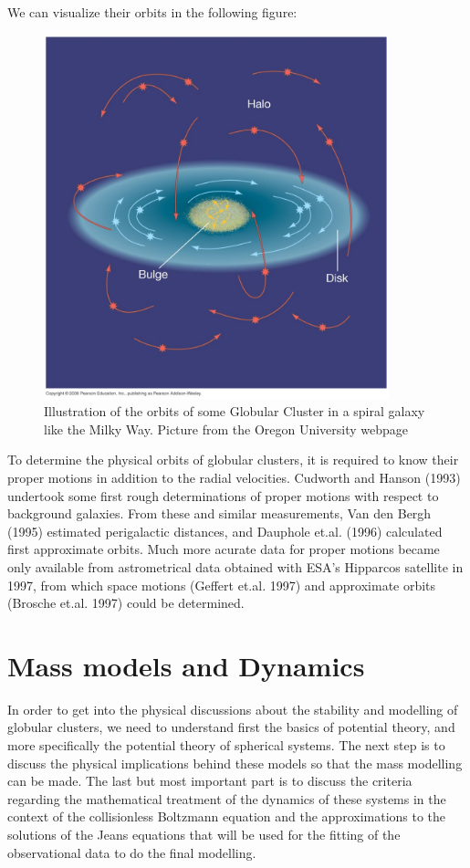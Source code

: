 We can visualize their orbits in the following figure:

\begin{figure}[H]
\centering
\includegraphics[width=10cm]{images/orbits_gcs.jpg}
\caption[Illustration of the orbits of Globular Clusters around a spiral galaxy]{Illustration of the orbits of some Globular Cluster in a spiral galaxy like the Milky Way. Picture from the Oregon University webpage}
\end{figure}

To determine the physical orbits of globular clusters, it is required to know their proper motions in addition to the radial velocities. Cudworth and Hanson (1993) undertook some first rough determinations of proper motions with respect to background galaxies. From these and similar measurements, Van den Bergh (1995) estimated perigalactic distances, and Dauphole et.al. (1996) calculated first approximate orbits. Much more acurate data for proper motions became only available from astrometrical data obtained with ESA's Hipparcos satellite in 1997, from which space motions (Geffert et.al. 1997) and approximate orbits (Brosche et.al. 1997) could be determined.

\section{Mass models and Dynamics}

In order to get into the physical discussions about the stability and modelling of globular clusters, we need to understand first the basics of potential theory, and more specifically the potential theory of spherical systems. The next step is to discuss the physical implications behind these models so that the mass modelling can be made. The last but most important part is to discuss the criteria regarding the mathematical treatment of the dynamics of these systems in the context of the collisionless Boltzmann equation and the approximations to the solutions of the Jeans equations that will be used for the fitting of the observational data to do the final modelling.

